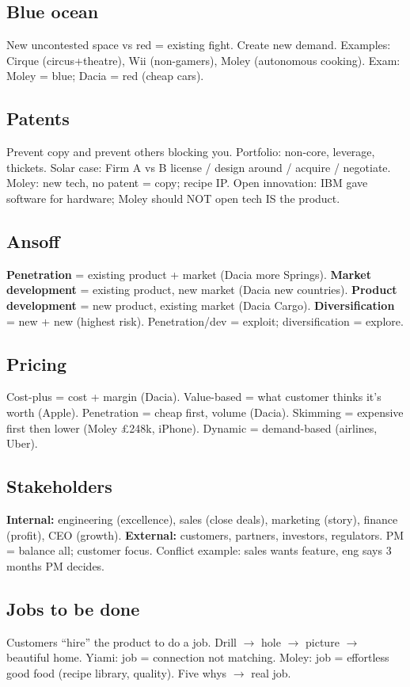 \documentclass[8pt,a4paper]{article}
\begin{document}
\subsection*{Blue ocean}
New uncontested space vs red = existing fight. Create new demand. Examples: Cirque (circus+theatre), Wii (non-gamers), Moley (autonomous cooking). Exam: Moley = blue; Dacia = red (cheap cars).

\subsection*{Patents}
Prevent copy and prevent others blocking you. Portfolio: non-core, leverage, thickets. Solar case: Firm A vs B license / design around / acquire / negotiate. Moley: new tech, no patent = copy; recipe IP. Open innovation: IBM gave software for hardware; Moley should NOT open tech IS the product.

\subsection*{Ansoff}
\textbf{Penetration} = existing product + market (Dacia more Springs). \textbf{Market development} = existing product, new market (Dacia new countries). \textbf{Product development} = new product, existing market (Dacia Cargo). \textbf{Diversification} = new + new (highest risk). Penetration/dev = exploit; diversification = explore.

\subsection*{Pricing}
Cost-plus = cost + margin (Dacia). Value-based = what customer thinks it's worth (Apple). Penetration = cheap first, volume (Dacia). Skimming = expensive first then lower (Moley £248k, iPhone). Dynamic = demand-based (airlines, Uber).

\subsection*{Stakeholders}
\textbf{Internal:} engineering (excellence), sales (close deals), marketing (story), finance (profit), CEO (growth). \textbf{External:} customers, partners, investors, regulators. PM = balance all; customer focus. Conflict example: sales wants feature, eng says 3 months PM decides.

\subsection*{Jobs to be done}
Customers ``hire'' the product to do a job. Drill $\to$ hole $\to$ picture $\to$ beautiful home. Yiami: job = connection not matching. Moley: job = effortless good food (recipe library, quality). Five whys $\to$ real job.
\end{document}
